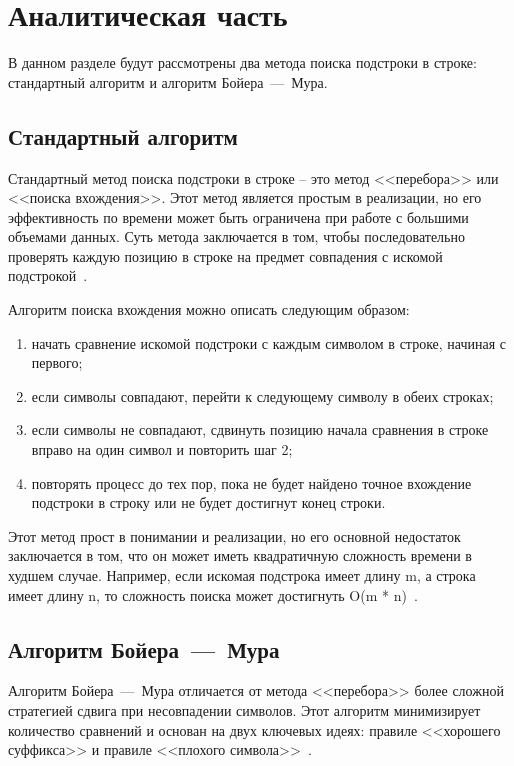 \chapter{Аналитическая часть}
В данном разделе будут рассмотрены два метода поиска подстроки в строке: стандартный алгоритм и алгоритм Бойера~---~Мура.

\section{Стандартный алгоритм}

Стандартный метод поиска подстроки в строке -- это метод <<перебора>> или <<поиска вхождения>>. 
Этот метод является простым в реализации, но его эффективность по времени может быть ограничена при работе с большими объемами данных. 
Суть метода заключается в том, чтобы последовательно проверять каждую позицию в строке на предмет совпадения с искомой подстрокой~\cite{search}.

Алгоритм поиска вхождения можно описать следующим образом:

\begin{enumerate}
	\item начать сравнение искомой подстроки с каждым символом в строке, начиная с первого;
	\item если символы совпадают, перейти к следующему символу в обеих строках;
	\item если символы не совпадают, сдвинуть позицию начала сравнения в строке вправо на один символ и повторить шаг 2;
	\item повторять процесс до тех пор, пока не будет найдено точное вхождение подстроки в строку или не будет достигнут конец строки.
\end{enumerate}

Этот метод прост в понимании и реализации, но его основной недостаток заключается в том, что он может иметь квадратичную сложность времени в худшем случае. 
Например, если искомая подстрока имеет длину m, а строка имеет длину n, то сложность поиска может достигнуть O(m * n)~\cite{intro}. 

\section{Алгоритм Бойера~---~Мура}

Алгоритм Бойера~---~Мура отличается от метода <<перебора>> более сложной стратегией сдвига при несовпадении символов. 
Этот алгоритм минимизирует количество сравнений и основан на двух ключевых идеях: правиле <<хорошего суффикса>> и правиле <<плохого символа>>~\cite{search}.

